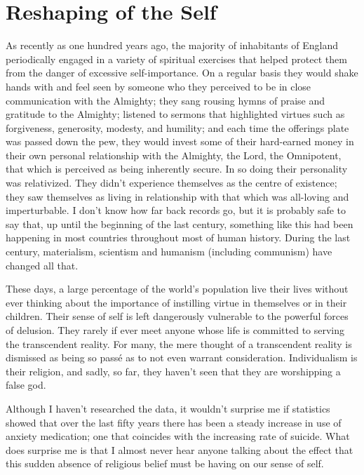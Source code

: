 \section{Reshaping of the Self}

As recently as one hundred years ago, the majority of inhabitants of
England periodically engaged in a variety of spiritual exercises that
helped protect them from the danger of excessive self-importance. On a
regular basis they would shake hands with and feel seen by someone who
they perceived to be in close communication with the Almighty; they sang
rousing hymns of praise and gratitude to the Almighty; listened to
sermons that highlighted virtues such as forgiveness, generosity,
modesty, and humility; and each time the offerings plate was passed down
the pew, they would invest some of their hard-earned money in their own
personal relationship with the Almighty, the Lord, the Omnipotent, that
which is perceived as being inherently secure. In so doing their
personality was relativized. They didn't experience themselves as the
centre of existence; they saw themselves as living in relationship with
that which was all-loving and imperturbable. I don't know how far back
records go, but it is probably safe to say that, up until the beginning
of the last century, something like this had been happening in most
countries throughout most of human history. During the last century,
materialism, scientism and humanism (including communism) have changed
all that.

These days, a large percentage of the world's population live their
lives without ever thinking about the importance of instilling virtue in
themselves or in their children. Their sense of self is left dangerously
vulnerable to the powerful forces of delusion. They rarely if ever meet
anyone whose life is committed to serving the transcendent reality. For
many, the mere thought of a transcendent reality is dismissed as being
so passé as to not even warrant consideration. Individualism is their
religion, and sadly, so far, they haven't seen that they are worshipping
a false god.

Although I haven't researched the data, it wouldn't surprise me if
statistics showed that over the last fifty years there has been a steady
increase in use of anxiety medication; one that coincides with the
increasing rate of suicide\cite{suicide}.
What does surprise me is that I almost never hear anyone
talking about the effect that this sudden absence of religious belief
must be having on our sense of self.

